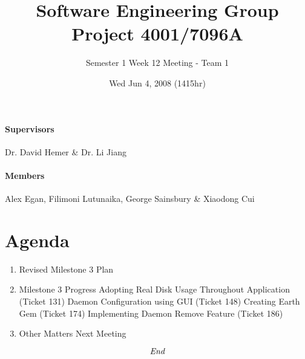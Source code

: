 \documentclass[10pt, a4]{article}
\begin{document}
\title{Software Engineering Group Project 4001/7096A}
\author{Semester 1 Week 12 Meeting - Team 1}
\date{Wed Jun 4, 2008 (1415hr)}

\maketitle

\paragraph{Supervisors} Dr. David Hemer \& Dr. Li Jiang

\paragraph{Members} Alex Egan, Filimoni Lutunaika, George Sainsbury \& Xiaodong Cui

\section*{Agenda}

\begin{enumerate}
\item Revised Milestone 3 Plan

\item Milestone 3 Progress
\subitem Adopting Real Disk Usage Throughout Application (Ticket 131)
\subitem Daemon Configuration using GUI (Ticket 148)
\subitem Creating Earth Gem (Ticket 174)
\subitem Implementing Daemon Remove Feature (Ticket 186)

\item Other Matters
\subitem Next Meeting


\end{enumerate}

\[\emph{End}\]
\end{document}
